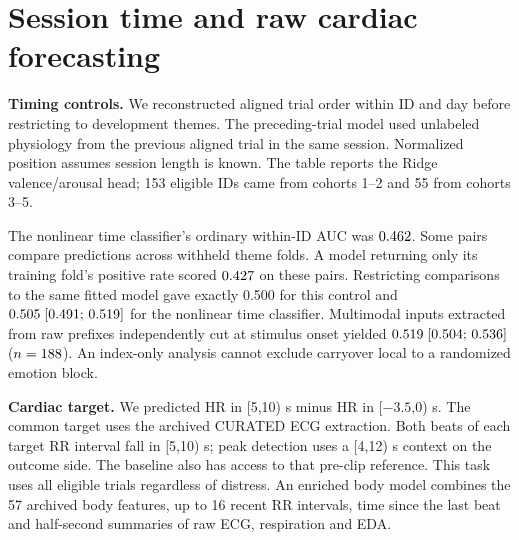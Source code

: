 \documentclass[10pt,a4paper]{article}
\begin{document}
\section{Session time and raw cardiac forecasting}
\textbf{Timing controls.} We reconstructed aligned trial order within ID and day before restricting to development themes. The preceding-trial model used unlabeled physiology from the previous aligned trial in the same session. Normalized position assumes session length is known. The table reports the Ridge valence/arousal head; 153 eligible IDs came from cohorts 1--2 and 55 from cohorts 3--5.
\begin{center}\small\OrderTable\end{center}
The nonlinear time classifier's ordinary within-ID AUC was $0.462$. Some pairs compare predictions across withheld theme folds. A model returning only its training fold's positive rate scored $0.427$ on these pairs. Restricting comparisons to the same fitted model gave exactly 0.500 for this control and $0.505\;[0.491;\,0.519]$ for the nonlinear time classifier. Multimodal inputs extracted from raw prefixes independently cut at stimulus onset yielded $0.519\;[0.504;\,0.536]$ ($n=188$). An index-only analysis cannot exclude carryover local to a randomized emotion block.

\textbf{Cardiac target.} We predicted HR in [5,10) s minus HR in [$-3.5$,0) s. The common target uses the archived CURATED ECG extraction. Both beats of each target RR interval fall in [5,10) s; peak detection uses a [4,12) s context on the outcome side. The baseline also has access to that pre-clip reference. This task uses all eligible trials regardless of distress. An enriched body model combines the 57 archived body features, up to 16 recent RR intervals, time since the last beat and half-second summaries of raw ECG, respiration and EDA.
\end{document}
